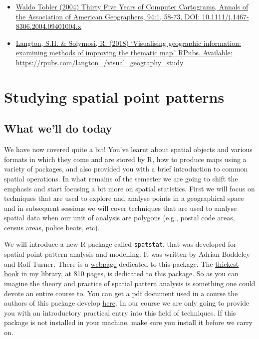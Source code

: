 \documentclass[]{book}
\providecommand{\tightlist}{%
  \setlength{\itemsep}{0pt}\setlength{\parskip}{0pt}}
\begin{document}
\begin{itemize}
\tightlist
\item
  \href{https://www.tandfonline.com/doi/full/10.1111/j.1467-8306.2004.09401004.x}{Waldo Tobler (2004) Thirty Five Years of Computer Cartograms, Annals of the Association of American Geographers, 94:1, 58-73, DOI: 10.1111/j.1467-8306.2004.09401004.x}
\item
  \href{https://rpubs.com/langton_/visual_geography_study}{Langton, S.H. \& Solymosi, R. (2018) `Visualising geographic information: examining methods of improving the thematic map.' RPubs. Available: https://rpubs.com/langton\_/visual\_geography\_study}
\end{itemize}

\hypertarget{studying-spatial-point-patterns}{%
\chapter{Studying spatial point patterns}\label{studying-spatial-point-patterns}}

\hypertarget{what-well-do-today}{%
\section{What we'll do today}\label{what-well-do-today}}

We have now covered quite a bit! You've learnt about spatial objects and various formats in which they come and are stored by R, how to produce maps using a variety of packages, and also provided you with a brief introduction to common spatial operations. In what remains of the semester we are going to shift the emphasis and start focusing a bit more on spatial statistics. First we will focus on techniques that are used to explore and analyse points in a geographical space and in subsequent sessions we will cover techniques that are used to analyse spatial data when our unit of analysis are polygons (e.g., postal code areas, census areas, police beats, etc).

We will introduce a new R package called \texttt{spatstat}, that was developed for spatial point pattern analysis and modelling. It was written by Adrian Baddeley and Rolf Turner. There is a \href{http://spatstat.org}{webpage} dedicated to this package. The \href{https://www.crcpress.com/Spatial-Point-Patterns-Methodology-and-Applications-with-R/Baddeley-Rubak-Turner/p/book/9781482210200}{thickest book} in my library, at 810 pages, is dedicated to this package. So as you can imagine the theory and practice of spatial pattern analysis is something one could devote an entire course to. You can get a pdf document used in a course the authors of this package develop \href{https://research.csiro.au/software/wp-content/uploads/sites/6/2015/02/Rspatialcourse_CMIS_PDF-Standard.pdf}{here}. In our course we are only going to provide you with an introductory practical entry into this field of techniques. If this package is not installed in your machine, make sure you install it before we carry on.
\end{document}
